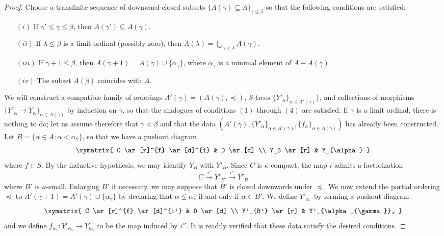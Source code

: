 \begin{proof}
Choose a transfinite sequence of downward-closed subsets $\{ A(\gamma) \subseteq A \}_{\gamma \leq \beta}$ so that the following conditions are satisfied:
\begin{itemize}
\item[$(i)$] If $\gamma' \leq \gamma \leq \beta$, then $A(\gamma') \subseteq A(\gamma)$.
\item[$(ii)$] If $\lambda \leq \beta$ is a limit ordinal (possibly zero), then
$A(\lambda) = \bigcup_{ \gamma < \lambda} A(\gamma)$.
\item[$(iii)$] If $\gamma + 1 \leq \beta$, then $A(\gamma+1) = A(\gamma) \cup \{ \alpha_{\gamma} \}$, where $\alpha_{\gamma}$ is a minimal element of $A - A(\gamma)$.
\item[$(iv)$] The subset $A(\beta)$ coincides with $A$.
\end{itemize}

We will construct a compatible family of orderings $A'(\gamma) = (A(\gamma), \preceq)$, $S$-trees $\{ Y'_{\alpha} \}_{ \alpha \in A'(\gamma)} \}$, and collections of morphisms 
$\{ Y'_{\alpha} \rightarrow Y_{\alpha} \}_{\alpha \in A(\gamma)}$ by induction on $\gamma$, so that the analogues of conditions $(1)$ through $(4)$ are satisfied. If $\gamma$ is a limit ordinal, there is nothing to do; let us assume therefore that $\gamma < \beta$ and that the data
$( A'(\gamma), \{ Y'_{\alpha} \}_{\alpha \in A'(\gamma)}, \{ f_{\alpha} \}_{\alpha \in A(\gamma)} )$ has already been constructed. Let $B = \{ \alpha \in A: \alpha < \alpha_{\gamma} \}$, so that we have a pushout diagram
$$ \xymatrix{ C \ar[r]^{f} \ar[d]^{i} & D \ar[d] \\
Y_B \ar[r] & Y_{\alpha} }$$
where $f \in S$. By the inductive hypothesis, we may identify $Y_{B}$ with $Y'_{B}$. 
Since $C$ is $\kappa$-compact, the map $i$ admits a factorization
$$C \stackrel{i'}{\rightarrow} Y'_{B'} \stackrel{i''}{\rightarrow} Y'_{B}$$
where $B'$ is $\kappa$-small. Enlarging $B'$ if necessary, we may suppose that
$B'$ is closed downwards under $\preceq$. We now extend the partial ordering
$\preceq$ to $A'(\gamma+1) = A'(\gamma) \cup \{ \alpha_{\gamma} \}$ by declaring that
$\alpha \leq \alpha_{\gamma}$ if and only if $\alpha \in B'$. We define
$Y'_{\alpha_{\gamma}}$ by forming a pushout diagram
$$ \xymatrix{ C \ar[r]^{f} \ar[d]^{i'} & D \ar[d] \\
Y'_{B'} \ar[r] & Y'_{\alpha_{\gamma}}, }$$
and we define $f_{\alpha_{\gamma}}: Y'_{\alpha_{\gamma}} \rightarrow Y_{\alpha_{\gamma}}$
to be the map induced by $i''$. It is readily verified that these data satisfy the desired conditions.
\end{proof}

